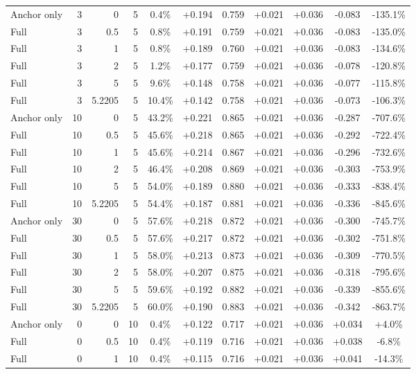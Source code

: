 \begin{table}[htbp]
\begin{tabular}{lrrrccccccc}
Anchor only & 3 & 0 & 5 & 0.4\% & +0.194 & 0.759 & +0.021 & +0.036 & -0.083 & -135.1\% \\
Full & 3 & 0.5 & 5 & 0.8\% & +0.191 & 0.759 & +0.021 & +0.036 & -0.083 & -135.0\% \\
Full & 3 & 1 & 5 & 0.8\% & +0.189 & 0.760 & +0.021 & +0.036 & -0.083 & -134.6\% \\
Full & 3 & 2 & 5 & 1.2\% & +0.177 & 0.759 & +0.021 & +0.036 & -0.078 & -120.8\% \\
Full & 3 & 5 & 5 & 9.6\% & +0.148 & 0.758 & +0.021 & +0.036 & -0.077 & -115.8\% \\
Full & 3 & 5.2205 & 5 & 10.4\% & +0.142 & 0.758 & +0.021 & +0.036 & -0.073 & -106.3\% \\
Anchor only & 10 & 0 & 5 & 43.2\% & +0.221 & 0.865 & +0.021 & +0.036 & -0.287 & -707.6\% \\
Full & 10 & 0.5 & 5 & 45.6\% & +0.218 & 0.865 & +0.021 & +0.036 & -0.292 & -722.4\% \\
Full & 10 & 1 & 5 & 45.6\% & +0.214 & 0.867 & +0.021 & +0.036 & -0.296 & -732.6\% \\
Full & 10 & 2 & 5 & 46.4\% & +0.208 & 0.869 & +0.021 & +0.036 & -0.303 & -753.9\% \\
Full & 10 & 5 & 5 & 54.0\% & +0.189 & 0.880 & +0.021 & +0.036 & -0.333 & -838.4\% \\
Full & 10 & 5.2205 & 5 & 54.4\% & +0.187 & 0.881 & +0.021 & +0.036 & -0.336 & -845.6\% \\
Anchor only & 30 & 0 & 5 & 57.6\% & +0.218 & 0.872 & +0.021 & +0.036 & -0.300 & -745.7\% \\
Full & 30 & 0.5 & 5 & 57.6\% & +0.217 & 0.872 & +0.021 & +0.036 & -0.302 & -751.8\% \\
Full & 30 & 1 & 5 & 58.0\% & +0.213 & 0.873 & +0.021 & +0.036 & -0.309 & -770.5\% \\
Full & 30 & 2 & 5 & 58.0\% & +0.207 & 0.875 & +0.021 & +0.036 & -0.318 & -795.6\% \\
Full & 30 & 5 & 5 & 59.6\% & +0.192 & 0.882 & +0.021 & +0.036 & -0.339 & -855.6\% \\
Full & 30 & 5.2205 & 5 & 60.0\% & +0.190 & 0.883 & +0.021 & +0.036 & -0.342 & -863.7\% \\
Anchor only & 0 & 0 & 10 & 0.4\% & +0.122 & 0.717 & +0.021 & +0.036 & +0.034 & +4.0\% \\
Full & 0 & 0.5 & 10 & 0.4\% & +0.119 & 0.716 & +0.021 & +0.036 & +0.038 & -6.8\% \\
Full & 0 & 1 & 10 & 0.4\% & +0.115 & 0.716 & +0.021 & +0.036 & +0.041 & -14.3\% \\

\end{tabular}
\end{table}
